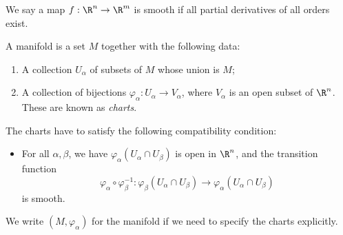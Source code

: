 \documentclass[a4paper]{article}
\begin{document}
\begin{defi}
  We say a map $f:\R^n \to \R^m$ is smooth if all partial derivatives of all orders exist.
\end{defi}

\begin{defi}[Manifold]
  A manifold is a set $M$ together with the following data:
  \begin{enumerate}
    \item A collection $U_\alpha$ of subsets of $M$ whose union is $M$;
    \item A collection of bijections $\varphi_\alpha: U_\alpha \to V_\alpha$, where $V_\alpha$ is an open subset of $\R^n$. These are known as \emph{charts}.
  \end{enumerate}
  The charts have to satisfy the following compatibility condition:
  \begin{itemize}
    \item For all $\alpha, \beta$, we have $\varphi_\alpha(U_\alpha \cap U_\beta)$ is open in $\R^n$, and the transition function
      \[
        \varphi_\alpha \circ \varphi_\beta^{-1}: \varphi_\beta(U_\alpha \cap U_\beta) \to \varphi_\alpha(U_\alpha \cap U_\beta)
      \]
      is smooth.
  \end{itemize}
  We write $(M, \varphi_\alpha)$ for the manifold if we need to specify the charts explicitly.
  \begin{center}
\end{center}
\end{defi}
\end{document}
